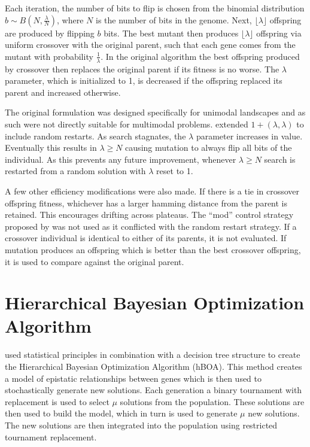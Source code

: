 Each iteration, the number of bits to flip is chosen from the binomial distribution $b\sim B(N, \frac{\lambda}{N})$,
where $N$ is the number of bits in the genome.
Next, $\lfloor\lambda\rfloor$ offspring are produced by flipping $b$ bits. The
best mutant then produces $\lfloor\lambda\rfloor$ offspring via uniform crossover with the original parent, such that each gene comes from the
mutant with probability $\frac{1}{\lambda}$. In the original algorithm the best
offspring produced by crossover then replaces the original parent if its fitness is no worse.
The $\lambda$ parameter, which is initialized to 1, is decreased if the offspring replaced
its parent and increased otherwise.

The original formulation was designed specifically for unimodal landscapes and as such were
not directly suitable for multimodal problems. \cite{goldman:2014:p3} extended $1+(\lambda, \lambda)$
to include random restarts. As search stagnates, the $\lambda$ parameter increases in value. Eventually
this results in $\lambda \ge N$ causing mutation to always flip all bits of the individual.
As this prevents any future improvement, whenever $\lambda \ge N$ search is restarted from a random solution with $\lambda$
reset to 1.

A few other efficiency modifications were also made. If there is a tie in crossover offspring fitness,
whichever has a larger hamming distance from the parent is retained. This encourages drifting across plateaus.
The ``mod'' control strategy proposed by \cite{doerr:2013:lambdalambda} was not used as it conflicted with
the random restart strategy.
If a crossover individual is identical to either of its parents, it is not evaluated.
If mutation produces an offspring which is better than the best crossover offspring, it is used to compare
against the original parent.

\section{Hierarchical Bayesian Optimization Algorithm}

\cite{pelikan:2006:hboa} used statistical principles in combination with a decision tree structure
to create the Hierarchical Bayesian Optimization Algorithm (hBOA). This method creates a model of
epistatic relationships between genes which is then used to stochastically generate new solutions.
Each generation a binary tournament with replacement is used to select $\mu$ solutions from
the population. These solutions are then used to build the model, which in turn is used to generate $\mu$ new
solutions. The new solutions are then integrated into the population using restricted tournament
replacement.

